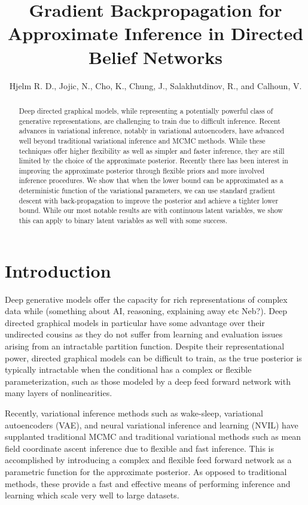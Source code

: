 \documentclass{article}
\begin{document}
\title{Gradient Backpropagation for Approximate Inference in Directed Belief Networks}
\author{Hjelm R. D., Jojic, N., Cho, K., Chung, J., Salakhutdinov, R., and Calhoun, V.}

\maketitle

\begin{abstract}
Deep directed graphical models, while representing a potentially powerful class of generative representations, are challenging to train due to difficult inference. Recent advances in variational inference, notably in variational autoencoders, have advanced well beyond traditional variational inference and MCMC methods. While these techniques offer higher flexibility as well as simpler and faster inference, they are still limited by the choice of the approximate posterior. Recently there has been interest in improving the approximate posterior through flexible priors and more involved inference procedures. We show that when the lower bound can be approximated as a deterministic function of the variational parameters, we can use standard gradient descent with back-propagation to improve the posterior and achieve a tighter lower bound. While our most notable results are with continuous latent variables, we show this can apply to binary latent variables as well with some success.
\end{abstract}


\section{Introduction}
Deep generative models offer the capacity for rich representations of complex data while (something about AI, reasoning, explaining away etc Neb?). Deep directed graphical models in particular have some advantage over their undirected cousins as they do not suffer from learning and evaluation issues arising from an intractable partition function. Despite their representational power, directed graphical models can be difficult to train, as the true posterior is typically intractable when the conditional has a complex or flexible parameterization, such as those modeled by a deep feed forward network with many layers of nonlinearities.

Recently, variational inference methods such as wake-sleep, variational autoencoders (VAE), and neural variational inference and learning (NVIL) have supplanted traditional MCMC and traditional variational methods such as mean field coordinate ascent inference due to flexible and fast inference. This is accomplished by introducing a complex and flexible feed forward network as a parametric function for the approximate posterior. As opposed to traditional methods, these provide a fast and effective means of performing inference and learning which scale very well to large datasets.
\end{document}
